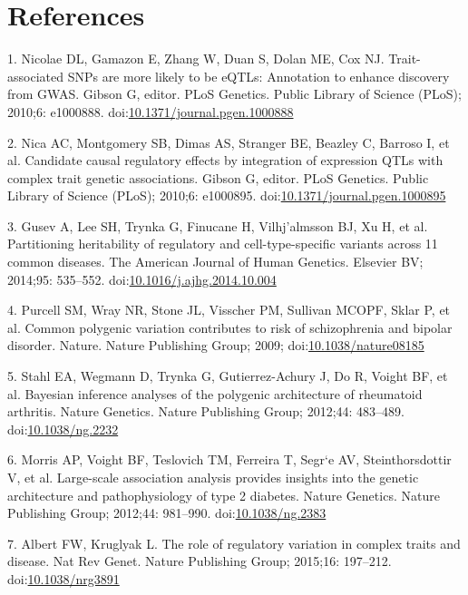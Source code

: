 \documentclass[]{article}
\begin{document}
\section*{References}\label{references}

1. Nicolae DL, Gamazon E, Zhang W, Duan S, Dolan ME, Cox NJ.
Trait-associated SNPs are more likely to be eQTLs: Annotation to enhance
discovery from GWAS. Gibson G, editor. PLoS Genetics. Public Library of
Science (PLoS); 2010;6: e1000888.
doi:\href{http://dx.doi.org/10.1371/journal.pgen.1000888}{10.1371/journal.pgen.1000888}

2. Nica AC, Montgomery SB, Dimas AS, Stranger BE, Beazley C, Barroso I,
et al. Candidate causal regulatory effects by integration of expression
QTLs with complex trait genetic associations. Gibson G, editor. PLoS
Genetics. Public Library of Science (PLoS); 2010;6: e1000895.
doi:\href{http://dx.doi.org/10.1371/journal.pgen.1000895}{10.1371/journal.pgen.1000895}

3. Gusev A, Lee SH, Trynka G, Finucane H, Vilhj{\a'a}lmsson BJ, Xu H, et
al. Partitioning heritability of regulatory and cell-type-specific
variants across 11 common diseases. The American Journal of Human
Genetics. Elsevier BV; 2014;95: 535--552.
doi:\href{http://dx.doi.org/10.1016/j.ajhg.2014.10.004}{10.1016/j.ajhg.2014.10.004}

4. Purcell SM, Wray NR, Stone JL, Visscher PM, Sullivan MCOPF, Sklar P,
et al. Common polygenic variation contributes to risk of schizophrenia
and bipolar disorder. Nature. Nature Publishing Group; 2009;
doi:\href{http://dx.doi.org/10.1038/nature08185}{10.1038/nature08185}

5. Stahl EA, Wegmann D, Trynka G, Gutierrez-Achury J, Do R, Voight BF,
et al. Bayesian inference analyses of the polygenic architecture of
rheumatoid arthritis. Nature Genetics. Nature Publishing Group; 2012;44:
483--489. doi:\href{http://dx.doi.org/10.1038/ng.2232}{10.1038/ng.2232}

6. Morris AP, Voight BF, Teslovich TM, Ferreira T, Segr{\a`e} AV,
Steinthorsdottir V, et al. Large-scale association analysis provides
insights into the genetic architecture and pathophysiology of type 2
diabetes. Nature Genetics. Nature Publishing Group; 2012;44: 981--990.
doi:\href{http://dx.doi.org/10.1038/ng.2383}{10.1038/ng.2383}

7. Albert FW, Kruglyak L. The role of regulatory variation in complex
traits and disease. Nat Rev Genet. Nature Publishing Group; 2015;16:
197--212. doi:\href{http://dx.doi.org/10.1038/nrg3891}{10.1038/nrg3891}
\end{document}
